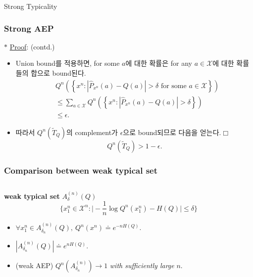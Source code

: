 \documentclass[9pt]{beamer}
\begin{document}
\begin{section}{Strong Typicality}
        \begin{frame}
            \frametitle{Strong AEP}
            $\ast$ \underline{Proof}: (contd.)
            \begin{itemize}
                \item Union bound를 적용하면, for some $a$에 대한 확률은 for any $a\in \mathcal X$에 대한 확률들의 합으로 bound된다.
                $$ \begin{aligned}
                    & Q^n\left(\left\{x^n:\left|\hat{P}_{x^n}(a)-Q(a)\right|>\delta \text { for some } a \in \mathcal{X}\right\}\right) \\
                    & \leq \sum_{a \in \mathcal{X}} Q^n\left(\left\{x^n:\left|\hat{P}_{x^n}(a)-Q(a)\right|>\delta\right\}\right) \\
                    & \leq \epsilon.
                \end{aligned} $$
                \item 따라서 $Q^n(\tilde T_Q)$의 complement가 $\epsilon$으로 bound되므로 다음을 얻는다.$\Box$
                $$ Q^n(\tilde T_Q) > 1-\epsilon.$$
            \end{itemize}
        \end{frame}


        \begin{frame}
            \frametitle{Comparison between weak typical set}
            \begin{columns}
                \begin{column}{0.5\textwidth}
                    \textbf{ weak typical set} $A^{(n)}_{\delta} (Q)$
                    \vspace{0.2cm}
                    {\footnotesize {$$  { \Big\{ x_1^n \in \mathcal X^n : \Big| - \frac{1}{n} \log Q^n (x^n_1) - H(Q) \Big| \le \delta \Big\}}$$}}
                    \begin{itemize}
                        \item $\forall x_1^n \in A_{\delta_n}^{(n)}(Q),\ Q^n (x^n) \doteq e^{-nH(Q)}$. %
                        \item $|A_{\delta_n}^{(n)} (Q)| \doteq e^{nH(Q)}$. %
                        \item (weak AEP) $Q^n(A_{\delta_n}^{(n)}) \rightarrow 1$ \textit{with sufficiently large} $n$. %
                    \end{itemize}
                \end{column}


\end{columns}
\end{frame}
\end{section}
\end{document}
